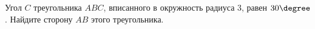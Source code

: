 \begin{ex}
	\begin{condition}
		Угол \( C \) треугольника \( ABC \), вписанного в окружность радиуса \( 3 \), равен \( 30\degree\). Найдите сторону \( AB  \) этого треугольника.
	\end{condition}
\end{ex}